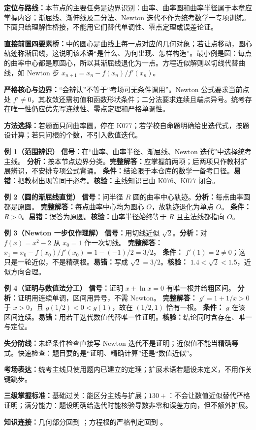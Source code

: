 \begin{knowledgeBox}
\textbf{定位与路线：}本节点的主要任务是边界识别：曲率、曲率圆和曲率半径属于本章应掌握内容；渐屈线、渐伸线及二分法、Newton 迭代不作为统考数学一专项训练。下面只给理解性桥接，不能用它们替代单调性、零点定理或误差论证。

\textbf{直接前置四要素桥：}中的圆心是曲线上每一点对应的几何对象；若让点移动，圆心轨迹称渐屈线，这说明该术语“是什么、为何出现、怎样构造”。最小例是圆：每点的曲率中心都是原圆心，所以其渐屈线退化为一点。方程近似解则以切线代替曲线，如 Newton 步 \(x_{n+1}=x_n-f(x_n)/f'(x_n)\)。

\textbf{严格核心与边界：}“会辨认”不等于“考场可无条件调用”。Newton 公式要求当前点处 \(f'\ne0\)，其收敛还需初值和函数形状条件；二分法要求连续且端点异号。统考存在唯一性仍应优先写连续性、零点定理和严格单调性。

\textbf{方法选择：}若题面只问曲率圆，停在 K077；若学校自命题明确给出迭代式，按题设计算；若只问根的个数，不引入数值迭代。

\textbf{例 1（范围辨识）}\quad
\textbf{信号：}在“曲率、曲率半径、渐屈线、Newton 迭代”中选择统考主线。
\textbf{分析：}按本节点边界分类。\textbf{完整解答：}应掌握前两项；后两项只作教材扩展辨识，不安排专项公式背诵。
\textbf{条件：}结论限于本仓库的数学一备考口径。\textbf{易错：}把教材出现等同于必考。\textbf{核验：}主线知识已由 K076、K077 闭合。

\textbf{例 2（圆的渐屈线直觉）}\quad
\textbf{信号：}问半径 \(R\) 圆的曲率中心轨迹。\textbf{分析：}每点曲率圆都是原圆。
\textbf{完整解答：}每点曲率中心均为圆心 \(O\)，故轨迹退化为单点 \(O\)。
\textbf{条件：} \(R>0\)。\textbf{易错：}误答为原圆。\textbf{核验：}曲率半径始终等于 \(R\) 且主法线都指向 \(O\)。

\textbf{例 3（Newton 一步仅作理解）}\quad
\textbf{信号：}用切线近似 \(\sqrt2\)。\textbf{分析：}对 \(f(x)=x^2-2\) 从 \(x_0=1\) 作一次切线。
\textbf{完整解答：} \(x_1=x_0-f(x_0)/f'(x_0)=1-(-1)/2=3/2\)。
\textbf{条件：} \(f'(1)=2\ne0\)；这只是一轮近似，不是精确根。\textbf{易错：}写成 \(\sqrt2=3/2\)。\textbf{核验：} \(1.4<\sqrt2<1.5\)，近似方向合理。

\textbf{例 4（证明与数值法分工）}\quad
\textbf{信号：}证明 \(x+\ln x=0\) 有唯一根并给粗区间。
\textbf{分析：}证明用连续单调，区间用异号，不需 Newton。
\textbf{完整解答：} \(g'=1+1/x>0\) 于 \(x>0\)，且 \(g(1/2)<0<g(1)\)，故在 \((1/2,1)\) 恰有一根。
\textbf{条件：} \(g\) 在该区间连续。\textbf{易错：}用若干迭代数值代替唯一性证明。\textbf{核验：}结论同时含存在、唯一与定位。

\textbf{失分防线：}未经条件检查直接写 Newton 迭代不是证明；近似值不能当精确等式。快速检查：题目要的是“证明、精确计算”还是“数值近似”。

\textbf{考场表达：}统考主线只使用题内已建立的定理；扩展术语若题设未定义，不用作关键跳步。

\textbf{三级掌握标准：}基础过关：能区分主线与扩展；\(130+\)：不会让数值近似替代严格证明；满分能力：题设明确给迭代时能核验导数非零和误差方向，但不额外扩展。

\textbf{知识连接：}几何部分回到 ；方程根的严格判定回到 。
\end{knowledgeBox}
